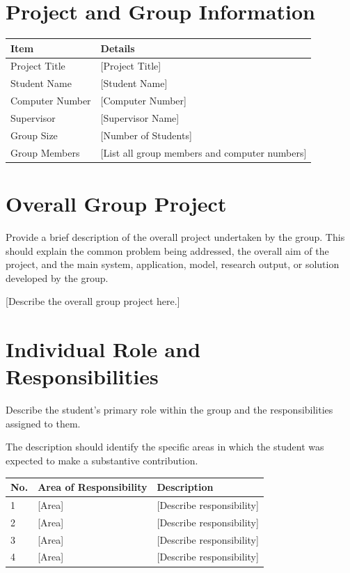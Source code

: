 \documentclass[12pt,a4paper]{report}
\begin{document}
\section{Project and Group Information}

\begin{table}[H]
\centering
\begin{tabular}{p{}p{}}
\toprule
\textbf{Item} & \textbf{Details} \\
\midrule
Project Title & [Project Title] \\
Student Name & [Student Name] \\
Computer Number & [Computer Number] \\
Supervisor & [Supervisor Name] \\
Group Size & [Number of Students] \\
Group Members & [List all group members and computer numbers] \\
\bottomrule
\end{tabular}
\end{table}

\section{Overall Group Project}

Provide a brief description of the overall project undertaken by the group. This should explain the common problem being addressed, the overall aim of the project, and the main system, application, model, research output, or solution developed by the group.

[Describe the overall group project here.]

\section{Individual Role and Responsibilities}

Describe the student's primary role within the group and the responsibilities assigned to them.

The description should identify the specific areas in which the student was expected to make a substantive contribution.

\begin{table}[H]
\centering
\begin{tabular}{p{}p{}p{}}
\toprule
\textbf{No.} & \textbf{Area of Responsibility} & \textbf{Description} \\
\midrule
1 & [Area] & [Describe responsibility] \\
2 & [Area] & [Describe responsibility] \\
3 & [Area] & [Describe responsibility] \\
4 & [Area] & [Describe responsibility] \\
\bottomrule
\end{tabular}
\end{table}
\end{document}
